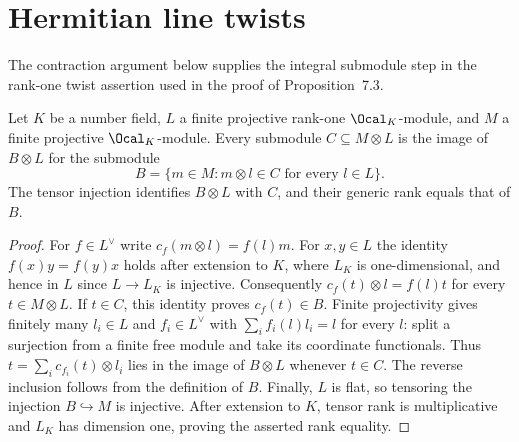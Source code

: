 \chapter{Hermitian line twists}

The contraction argument below supplies the integral submodule step in the
rank-one twist assertion used in the proof of Proposition~7.3.

\begin{lemma}
\label{lem:line-twist-submodules}
\leanok
Let $K$ be a number field, $L$ a finite projective rank-one
$\Ocal_K$-module, and $M$ a finite projective $\Ocal_K$-module.
Every submodule $C\subseteq M\otimes L$
is the image of $B\otimes L$ for the submodule
\[
 B=\{m\in M: m\otimes l\in C\text{ for every }l\in L\}.
\]
The tensor injection identifies $B\otimes L$ with $C$, and their
generic rank equals that of $B$.
\end{lemma}
\begin{proof}
For $f\in L^\vee$ write $c_f(m\otimes l)=f(l)m$.
For $x,y\in L$ the identity $f(x)y=f(y)x$ holds after extension
to $K$, where $L_K$ is one-dimensional, and hence in $L$ since
$L\longrightarrow L_K$ is injective. Consequently
$c_f(t)\otimes l=f(l)t$ for every $t\in M\otimes L$.
If $t\in C$, this identity proves $c_f(t)\in B$.
Finite projectivity gives finitely many $l_i\in L$ and
$f_i\in L^\vee$ with $\sum_i f_i(l)l_i=l$ for every $l$:
split a surjection from a finite free module and take its coordinate
functionals. Thus $t=\sum_i c_{f_i}(t)\otimes l_i$ lies in the
image of $B\otimes L$ whenever $t\in C$. The reverse inclusion
follows from the definition of $B$. Finally, $L$ is flat, so tensoring
the injection $B\hookrightarrow M$ is injective.
After extension to $K$, tensor rank is multiplicative and $L_K$ has
dimension one, proving the asserted rank equality.
\end{proof}

